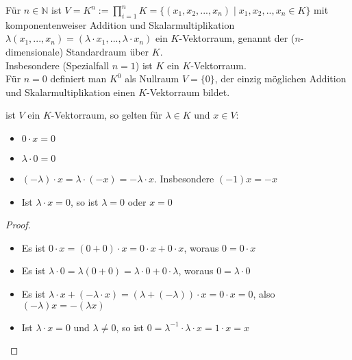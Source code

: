 \begin{example}
	Für $n \in \mathbb N$ ist $V=K^n := \prod _{i=1}^n K = \{(x_1,x_2,...,x_n) \mid x_1,x_2,..,
	x_n \in K\}$ mit komponentenweiser Addition und Skalarmultiplikation $\lambda(x_1,...,x_n)=(\lambda\cdot x_1,...,
	\lambda\cdot x_n)$ ein $K$-Vektorraum, genannt der ($n$-dimensionale) Standardraum über $K$. \\ 
	Insbesondere (Spezialfall $n=1$) ist $K$ ein $K$-Vektorraum. \\
	Für $n=0$ definiert man $K^0$ als Nullraum $V=\{0\}$, der einzig möglichen Addition und Skalarmultiplikation einen 
	$K$-Vektorraum bildet.
\end{example}

\begin{proposition}
	ist $V$ ein $K$-Vektorraum, so gelten für $\lambda \in K$ und $x \in V$:
	\begin{itemize}
		\item $0\cdot x =0$
		\item $\lambda\cdot 0=0$
		\item $(-\lambda)\cdot x = \lambda\cdot(-x) = -\lambda\cdot x$. Insbesondere $(-1)x=-x$
		\item Ist $\lambda\cdot x=0$, so ist $\lambda=0$ oder $x=0$
	\end{itemize}
\end{proposition}
\begin{proof}
	\begin{itemize}
		\item Es ist $0\cdot x=(0+0)\cdot x=0\cdot x+0\cdot x$, woraus $0=0\cdot x$
		\item Es ist $\lambda\cdot 0=\lambda(0+0)=\lambda\cdot 0+0\cdot \lambda$, woraus $0=\lambda\cdot 0$
		\item Es ist $\lambda\cdot x+(-\lambda\cdot x)=(\lambda+(-\lambda))\cdot x=0\cdot x=0$, also $(-\lambda)x=-(\lambda 
		x)$
		\item Ist $\lambda\cdot x=0$ und $\lambda\neq 0$, so ist $0=\lambda^{-1}\cdot\lambda\cdot x=1\cdot x=x$ 
	\end{itemize}
\end{proof}

